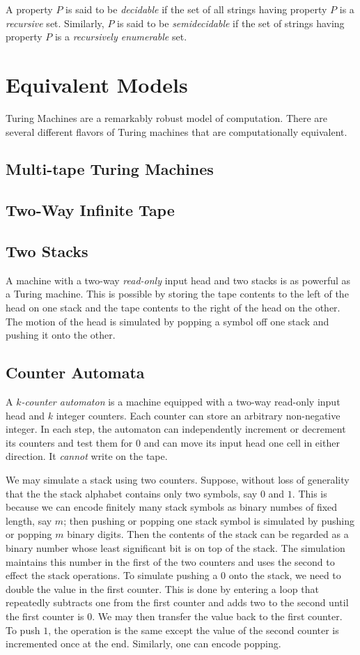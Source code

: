 A property $P$ is said to be \textit{decidable} if the set of all strings having property $P$ is a \textit{recursive} set. Similarly, $P$ is said to be \textit{semidecidable} if the set of strings having property $P$ is a \textit{recursively enumerable} set.

\section{Equivalent Models}
Turing Machines are a remarkably robust model of computation. There are several different flavors of Turing machines that are computationally equivalent.

\subsection{Multi-tape Turing Machines}
\subsection{Two-Way Infinite Tape}
\subsection{Two Stacks}
A machine with a two-way \textit{read-only} input head and two stacks is as powerful as a Turing machine. This is possible by storing the tape contents to the left of the head on one stack and the tape contents to the right of the head on the other. The motion of the head is simulated by popping a symbol off one stack and pushing it onto the other.

\subsection{Counter Automata}
A \textit{$k$-counter automaton} is a machine equipped with a two-way read-only input head and $k$ integer counters. Each counter can store an arbitrary non-negative integer. In each step, the automaton can independently increment or decrement its counters and test them for $0$ and can move its input head one cell in either direction. It \textit{cannot} write on the tape.

We may simulate a stack using two counters. Suppose, without loss of generality that the the stack alphabet contains only two symbols, say $0$ and $1$. This is because we can encode finitely many stack symbols as binary numbes of fixed length, say $m$; then pushing or popping one stack symbol is simulated by pushing or popping $m$ binary digits. Then the contents of the stack can be regarded as a binary number whose least significant bit is on top of the stack. The simulation maintains this number in the first of the two counters and uses the second to effect the stack operations. To simulate pushing a $0$ onto the stack, we need to double the value in the first counter. This is done by entering a loop that repeatedly subtracts one from the first counter and adds two to the second until the first counter is $0$. We may then transfer the value back to the first counter. To push $1$, the operation is the same except the value of the second counter is incremented once at the end. Similarly, one can encode popping.

